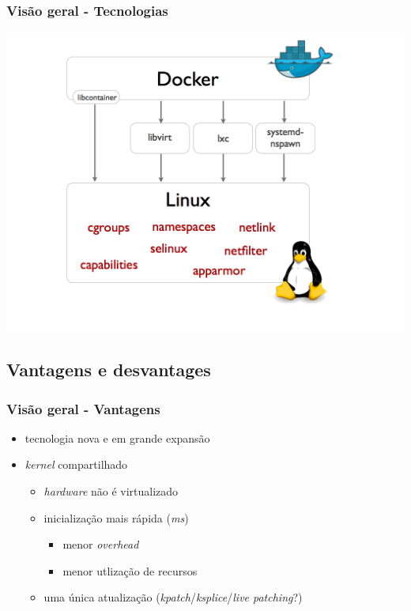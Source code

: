 \documentclass{beamer}
\begin{document}
\begin{frame}
    \frametitle{Visão geral - Tecnologias}
    \centering
    \includegraphics[width=1\linewidth]{img/docker-execdriver-diagram.png}
\end{frame}

\subsection{Vantagens e desvantages}

\begin{frame}
    \frametitle{Visão geral - Vantagens}
    \begin{itemize}
        \item tecnologia nova e em grande expansão
        \item \textit{kernel} compartilhado
            \begin{itemize}
                \item \textit{hardware} não é virtualizado
                \item inicialização mais rápida (\textit{ms})
                \begin{itemize}
                    \item menor \textit{overhead}
                    \item menor utlização de recursos
                \end{itemize}
                \item uma única atualização
                    (\textit{kpatch}/\textit{ksplice}/\textit{live patching}?)
            \end{itemize}
    \end{itemize}
\end{frame}
\end{document}
